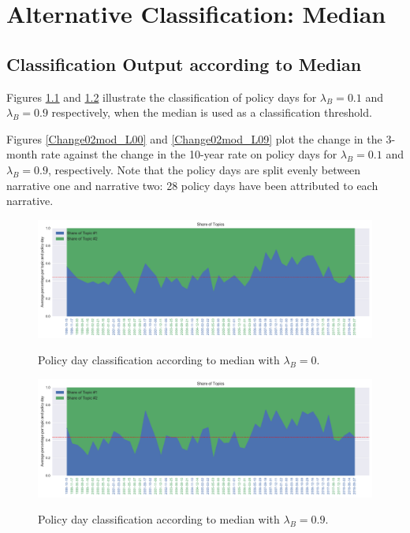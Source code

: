 \documentclass[11pt,a4paper,english,oneside]{book}
\numberwithin{equation}{chapter}
\begin{document}
\renewcommand{\theequation}{E.\arabic{equation}}


\chapter{Alternative Classification: Median}\label{AppendixE}



\section{Classification Output according to Median}\label{AppendixE1}

Figures \ref{classPLSAmed} and \ref{classPLSAmed0_9} illustrate the classification of policy days for $\lambda_B = 0.1$ and $\lambda_B = 0.9$ respectively, when the median is used as a classification threshold. 

Figures \ref{Change02mod_L00} and \ref{Change02mod_L09} plot the change in the 3-month rate against the change in the 10-year rate on policy days for $\lambda_B = 0.1$ and $\lambda_B = 0.9$, respectively. Note that the policy days are split evenly between narrative one and narrative two: 28 policy days have been attributed to each narrative. 


\begin{figure}
	\caption{Policy day classification according to median with $\lambda_B = 0$.}
	\centering
	\includegraphics[scale=0.8]{Images/plsamodelling_bg_modLamb_0_0.pdf}
	\label{classPLSAmed}
\end{figure}


\begin{figure}
	\caption{Policy day classification according to median with $\lambda_B = 0.9$.}
	\centering
	\includegraphics[scale=0.8]{Images/plsamodelling_bg_modLamb_0_9.pdf}
	\label{classPLSAmed0_9}
\end{figure}
\end{document}
